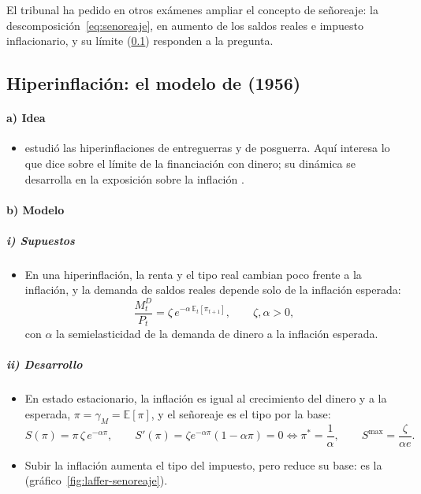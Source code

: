 \documentclass[11pt]{article}
\begin{document}
\begin{notaopositor}
El tribunal ha pedido en otros exámenes ampliar el concepto de señoreaje: la descomposición~\eqref{eq:senoreaje}, en aumento de los saldos reales e impuesto inflacionario, y su límite (\ref{sec:cagan}) responden a la pregunta.
\end{notaopositor}

\subsection{Hiperinflación: el modelo de  (1956)}\label{sec:cagan}

\paragraph{a) Idea}

\begin{itemize}
\item \textcite{Cagan1956Monetary} estudió las hiperinflaciones de entreguerras y de posguerra. Aquí interesa lo que dice sobre el límite de la financiación con dinero; su dinámica se desarrolla en la exposición sobre la inflación .
\end{itemize}

\paragraph{b) Modelo}

\subparagraph{i) Supuestos}

\begin{itemize}
\item En una hiperinflación, la renta y el tipo real cambian poco frente a la inflación, y la demanda de saldos reales depende solo de la inflación esperada:
  \begin{equation*}
  \frac{M^D_t}{P_t}=\zeta\,e^{-\alpha\,\mathbb{E}_t[\pi_{t+1}]},\qquad\zeta,\alpha>0,
  \end{equation*}
  con $\alpha$ la semielasticidad de la demanda de dinero a la inflación esperada.
\end{itemize}

\subparagraph{ii) Desarrollo}

\begin{itemize}
\item En estado estacionario, la inflación es igual al crecimiento del dinero y a la esperada, $\pi=\gamma_M=\mathbb{E}[\pi]$, y el señoreaje es el tipo por la base:
  \begin{equation}\label{eq:laffer-senoreaje}
  S(\pi)=\pi\,\zeta\,e^{-\alpha\pi},\qquad S'(\pi)=\zeta e^{-\alpha\pi}(1-\alpha\pi)=0\iff\pi^*=\frac{1}{\alpha},\qquad S^{\max}=\frac{\zeta}{\alpha e}.
  \end{equation}
\item Subir la inflación aumenta el tipo del impuesto, pero reduce su base: es la  (gráfico~\ref{fig:laffer-senoreaje}).
\end{itemize}
\end{document}
